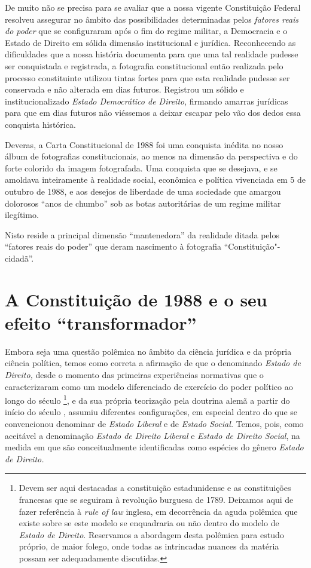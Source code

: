 De muito não se precisa para se avaliar que a nossa vigente Constituição
Federal resolveu assegurar no âmbito das possibilidades determinadas
pelos \emph{fatores reais do poder} que se configuraram após o fim do
regime militar, a Democracia e o Estado de Direito em sólida dimensão
institucional e jurídica. Reconhecendo as dificuldades que a nossa
história documenta para que uma tal realidade pudesse ser conquistada e
registrada, a fotografia constitucional então realizada pelo processo
constituinte utilizou tintas fortes para que esta realidade pudesse ser
conservada e não alterada em dias futuros. Registrou um sólido e
institucionalizado \emph{Estado Democrático de Direito}, firmando
amarras jurídicas para que em dias futuros não viéssemos a deixar
escapar pelo vão dos dedos essa conquista histórica.

Deveras, a Carta Constitucional de 1988 foi uma conquista inédita no
nosso álbum de fotografias constitucionais, ao menos na dimensão da
perspectiva e do forte colorido da imagem fotografada. Uma conquista que
se desejava, e se amoldava inteiramente à realidade social, econômica e
política vivenciada em 5 de outubro de 1988, e aos desejos de liberdade
de uma sociedade que amargou dolorosos ``anos de chumbo'' sob as
botas autoritárias de um regime militar ilegítimo.

Nisto reside a principal dimensão ``mantenedora'' da realidade
ditada pelos ``fatores reais do poder'' que deram nascimento à
fotografia ``Constituição"-cidadã''.

\section{A Constituição de 1988 e o seu efeito
``transformador''}

Embora seja uma questão polêmica no âmbito da ciência jurídica e da
própria ciência política, temos como correta a afirmação de que o
denominado \emph{Estado de Direito,} desde o momento das primeiras
experiências normativas que o caracterizaram como um modelo diferenciado
de exercício do poder político ao longo do século \footnote{Devem
  ser aqui destacadas a constituição estadunidense e as constituições
  francesas que se seguiram à revolução burguesa de 1789. Deixamos aqui
  de fazer referência à \emph{rule of law} inglesa, em decorrência da
  aguda polêmica que existe sobre se este modelo se enquadraria ou não
  dentro do modelo de \emph{Estado de Direito}. Reservamos a abordagem
  desta polêmica para estudo próprio, de maior folego, onde todas as
  intrincadas nuances da matéria possam ser adequadamente discutidas.},
e da sua própria teorização pela doutrina alemã a partir do início do
século , assumiu diferentes configurações, em especial dentro do que
se convencionou denominar de \emph{Estado Liberal} e de \emph{Estado
Social.} Temos, pois, como aceitável a denominação \emph{Estado de
Direito Liberal} e \emph{Estado de Direito Social}, na medida em que são
conceitualmente identificadas como espécies do gênero \emph{Estado de
Direito.}

